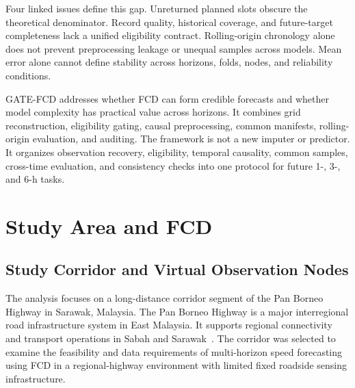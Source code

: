 \documentclass[pdflatex,sn-mathphys-num,iicol]{sn-jnl}
\begin{document}
Four linked issues define this gap. Unreturned planned slots obscure the theoretical denominator. Record quality, historical coverage, and future-target completeness lack a unified eligibility contract. Rolling-origin chronology alone does not prevent preprocessing leakage or unequal samples across models. Mean error alone cannot define stability across horizons, folds, nodes, and reliability conditions.

GATE-FCD addresses whether FCD can form credible forecasts and whether model complexity has practical value across horizons. It combines grid reconstruction, eligibility gating, causal preprocessing, common manifests, rolling-origin evaluation, and auditing. The framework is not a new imputer or predictor. It organizes observation recovery, eligibility, temporal causality, common samples, cross-time evaluation, and consistency checks into one protocol for future 1-, 3-, and 6-h tasks.

\section{Study Area and FCD}
\label{sec:data}



\subsection{Study Corridor and Virtual Observation Nodes}
\label{subsec:study-corridor}

The analysis focuses on a long-distance corridor segment of the Pan Borneo Highway in Sarawak, Malaysia. The Pan Borneo Highway is a major interregional road infrastructure system in East Malaysia. It supports regional connectivity and transport operations in Sabah and Sarawak~\cite{Kam2025PanBorneo,Azmi2025PanBorneo}. The corridor was selected to examine the feasibility and data requirements of multi-horizon speed forecasting using FCD in a regional-highway environment with limited fixed roadside sensing infrastructure.
\end{document}
